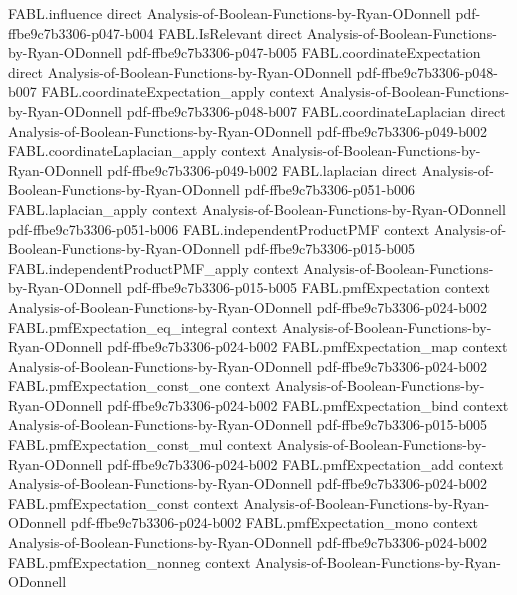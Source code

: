 \begin{theorem}
\proofstep
  {FABL.influence}
  {direct}
  {Analysis-of-Boolean-Functions-by-Ryan-ODonnell}
  {pdf-ffbe9c7b3306-p047-b004}
\proofstep
  {FABL.IsRelevant}
  {direct}
  {Analysis-of-Boolean-Functions-by-Ryan-ODonnell}
  {pdf-ffbe9c7b3306-p047-b005}
\proofstep
  {FABL.coordinateExpectation}
  {direct}
  {Analysis-of-Boolean-Functions-by-Ryan-ODonnell}
  {pdf-ffbe9c7b3306-p048-b007}
\proofstep
  {FABL.coordinateExpectation_apply}
  {context}
  {Analysis-of-Boolean-Functions-by-Ryan-ODonnell}
  {pdf-ffbe9c7b3306-p048-b007}
\proofstep
  {FABL.coordinateLaplacian}
  {direct}
  {Analysis-of-Boolean-Functions-by-Ryan-ODonnell}
  {pdf-ffbe9c7b3306-p049-b002}
\proofstep
  {FABL.coordinateLaplacian_apply}
  {context}
  {Analysis-of-Boolean-Functions-by-Ryan-ODonnell}
  {pdf-ffbe9c7b3306-p049-b002}
\proofstep
  {FABL.laplacian}
  {direct}
  {Analysis-of-Boolean-Functions-by-Ryan-ODonnell}
  {pdf-ffbe9c7b3306-p051-b006}
\proofstep
  {FABL.laplacian_apply}
  {context}
  {Analysis-of-Boolean-Functions-by-Ryan-ODonnell}
  {pdf-ffbe9c7b3306-p051-b006}
\proofstep
  {FABL.independentProductPMF}
  {context}
  {Analysis-of-Boolean-Functions-by-Ryan-ODonnell}
  {pdf-ffbe9c7b3306-p015-b005}
\proofstep
  {FABL.independentProductPMF_apply}
  {context}
  {Analysis-of-Boolean-Functions-by-Ryan-ODonnell}
  {pdf-ffbe9c7b3306-p015-b005}
\proofstep
  {FABL.pmfExpectation}
  {context}
  {Analysis-of-Boolean-Functions-by-Ryan-ODonnell}
  {pdf-ffbe9c7b3306-p024-b002}
\proofstep
  {FABL.pmfExpectation_eq_integral}
  {context}
  {Analysis-of-Boolean-Functions-by-Ryan-ODonnell}
  {pdf-ffbe9c7b3306-p024-b002}
\proofstep
  {FABL.pmfExpectation_map}
  {context}
  {Analysis-of-Boolean-Functions-by-Ryan-ODonnell}
  {pdf-ffbe9c7b3306-p024-b002}
\proofstep
  {FABL.pmfExpectation_const_one}
  {context}
  {Analysis-of-Boolean-Functions-by-Ryan-ODonnell}
  {pdf-ffbe9c7b3306-p024-b002}
\proofstep
  {FABL.pmfExpectation_bind}
  {context}
  {Analysis-of-Boolean-Functions-by-Ryan-ODonnell}
  {pdf-ffbe9c7b3306-p015-b005}
\proofstep
  {FABL.pmfExpectation_const_mul}
  {context}
  {Analysis-of-Boolean-Functions-by-Ryan-ODonnell}
  {pdf-ffbe9c7b3306-p024-b002}
\proofstep
  {FABL.pmfExpectation_add}
  {context}
  {Analysis-of-Boolean-Functions-by-Ryan-ODonnell}
  {pdf-ffbe9c7b3306-p024-b002}
\proofstep
  {FABL.pmfExpectation_const}
  {context}
  {Analysis-of-Boolean-Functions-by-Ryan-ODonnell}
  {pdf-ffbe9c7b3306-p024-b002}
\proofstep
  {FABL.pmfExpectation_mono}
  {context}
  {Analysis-of-Boolean-Functions-by-Ryan-ODonnell}
  {pdf-ffbe9c7b3306-p024-b002}
\proofstep
  {FABL.pmfExpectation_nonneg}
  {context}
  {Analysis-of-Boolean-Functions-by-Ryan-ODonnell}

\end{theorem}
